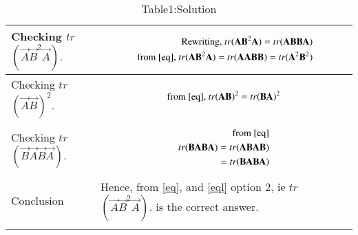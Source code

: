 \documentclass[journal,12pt,onecolumn]{IEEEtran}
\begin{document}
\begin{longtable}{|p{5cm}|p{13cm}|}
\hline
 Checking $tr$$(\vec{A} \vec{B}^2 \vec{A}).$&
\parbox{12cm}{\begin{align}\text{Rewriting,}
\  tr(\vec{A} \vec{B}^2 \vec{A}) =tr(\vec{A}\vec{B} \vec{B}\vec{A})\\\text{ from \eqref{eq},}\
 tr(\vec{A} \vec{B}^2 \vec{A})=  tr(\vec{A}\vec{A} \vec{B}\vec{B})\label{eq3}\label{eql}=tr(\vec{A}^2 \vec{B}^2)  
\end{align}}\\
\hline
Checking $tr$$(\vec{A} \vec{B})^2.$&
\parbox{12cm}{\begin{align}\text{from \eqref{eq},}\
 tr(\vec{A} \vec{B})^2=tr(\vec{B}\vec{A})^2 
\end{align}}\\
\hline
 Checking $tr$$(\vec{B} \vec{A} \vec{B} \vec{A}).$&
\parbox{12cm}{\begin{align}\text{from \eqref{eq}}\\
 tr(\vec{B} \vec{A} \vec{B} \vec{A}) =tr(\vec{A}\vec{B} \vec{A}\vec{B})\\
 =tr(\vec{B}\vec{A} \vec{B}\vec{A})
 \end{align}}\\
\hline
 Conclusion&
Hence, from \eqref{eq}, and \eqref{eql} option 2, ie  $tr$$(\vec{A} \vec{B}^2 \vec{A}).$ is the correct answer.\\
\hline
\caption*{Table1:Solution}
\end{longtable}
\end{document}
